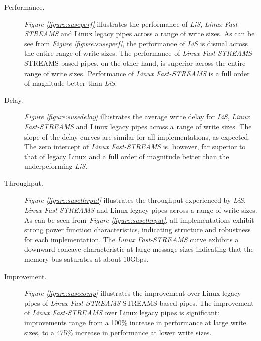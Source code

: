 \documentclass[letterpaper,final,notitlepage,twocolumn,10pt,twoside]{article}
\begin{document}
\begin{description}

\item[Performance.]

\textit{Figure \ref{figure:suseperf}} illustrates the performance of
\textsl{LiS}, \textsl{Linux Fast-STREAMS} and Linux legacy pipes across a
range of write sizes.  As can be see from \textit{Figure
\ref{figure:suseperf}}, the performance of \textsl{LiS} is dismal across the
entire range of write sizes.  The performance of \textsl{Linux Fast-STREAMS}
STREAMS-based pipes, on the other hand, is superior across the entire range of
write sizes.
Performance of \textsl{Linux Fast-STREAMS} is a full order of magnitude better
than \textsl{LiS}.

\item[Delay.]

\textit{Figure \ref{figure:susedelay}} illustrates the average write delay for
\textsl{LiS}, \textsl{Linux Fast-STREAMS} and Linux legacy pipes across a
range of write sizes.  The slope of the delay curves are similar for all
implementations, as expected.  The zero intercept of \textsl{Linux
Fast-STREAMS} is, however, far superior to that of legacy Linux and a full
order of magnitude better than the underpeforming \textsl{LiS}.

\item[Throughput.]

\textit{Figure \ref{figure:susethrput}} illustrates the throughput experienced
by \textsl{LiS}, \textsl{Linux Fast-STREAMS} and Linux legacy pipes across a
range of write sizes.  As can be seen from \textit{Figure
\ref{figure:susethrput}}, all implementations exhibit strong power function
characteristics, indicating structure and robustness for each implementation.
The \textsl{Linux Fast-STREAMS} curve exhibits a downward concave
characteristic at large message sizes indicating that the memory bus saturates
at about 10Gbps.

\item[Improvement.]

\textit{Figure \ref{figure:susecomp}} illustrates the improvement over Linux
legacy pipes of \textsl{Linux Fast-STREAMS} STREAMS-based pipes.  The
improvement of \textsl{Linux Fast-STREAMS} over Linux legacy pipes is
significant: improvements range from a 100\% increase in performance at large
write sizes, to a 475\% increase in performance at lower write sizes.

\end{description}
\end{document}
